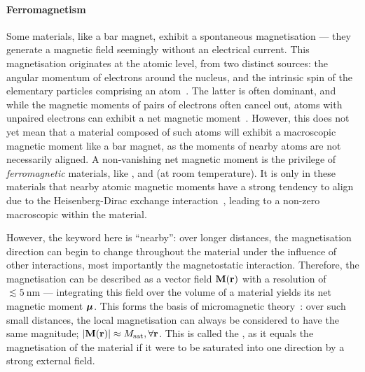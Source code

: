 \paragraph{Ferromagnetism}
Some materials, like a bar magnet, exhibit a spontaneous magnetisation --- they generate a magnetic field seemingly without an electrical current.
This magnetisation originates at the atomic level, from two distinct sources: the angular momentum of electrons around the nucleus, and the intrinsic spin of the elementary particles comprising an atom~\cite{coey2010magnetism}.
The latter is often dominant, and while the magnetic moments of pairs of electrons often cancel out, atoms with unpaired electrons can exhibit a net magnetic moment~\cite{PhD_Leliaert}. %
However, this does not yet mean that a material composed of such atoms will exhibit a macroscopic magnetic moment like a bar magnet, as the moments of nearby atoms are not necessarily aligned.
A non-vanishing net magnetic moment is the privilege of \textit{ferromagnetic} materials, like ,  and  (at room temperature).
It is only in these materials that nearby atomic magnetic moments have a strong tendency to align due to the Heisenberg-Dirac exchange interaction~\cite{heisenberg1928theorie}, leading to a non-zero macroscopic  within the material. \par
However, the keyword here is ``nearby'': over longer distances, the magnetisation direction can begin to change throughout the material under the influence of other interactions, most importantly the magnetostatic interaction.
Therefore, the magnetisation can be described as a vector field $\boldsymbol{\mathbf{M}}(\boldsymbol{\mathbf{r}})$ with a resolution of $\lesssim \SI{5}{\nano\metre}$ --- integrating this field over the volume of a material yields its net magnetic moment $\boldsymbol{\mathbf{\mu}}$.
This forms the basis of micromagnetic theory~\cite{mumax3}: over such small distances, the local magnetisation can always be considered to have the same magnitude; $|\boldsymbol{\mathbf{M}}(\boldsymbol{\mathbf{r}})| \approx M_\mathrm{sat}, \forall \boldsymbol{\mathbf{r}}$.
This is called the , as it equals the magnetisation of the material if it were to be saturated into one direction by a strong external field.

